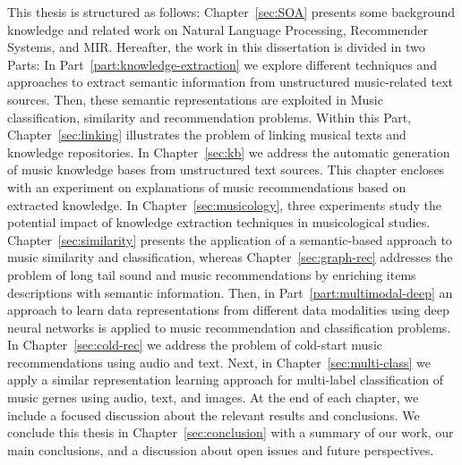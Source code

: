This thesis is structured as follows: Chapter~\ref{sec:SOA} presents some background knowledge and related work on Natural Language Processing, Recommender Systems, and MIR. Hereafter, the work in this dissertation is divided in two Parts: In Part~\ref{part:knowledge-extraction} we explore different techniques and approaches to extract semantic information from unstructured music-related text sources. Then, these semantic representations are exploited in Music classification, similarity and recommendation problems. Within this Part, Chapter~\ref{sec:linking} illustrates the problem of linking musical texts and knowledge repositories. In Chapter~\ref{sec:kb} we address the automatic generation of music knowledge bases from unstructured text sources. This chapter encloses with an experiment on explanations of music recommendations based on extracted knowledge. In Chapter~\ref{sec:musicology}, three experiments study the potential impact of knowledge extraction techniques in musicological studies.
Chapter~\ref{sec:similarity} presents the application of a semantic-based approach to music similarity and classification, whereas Chapter~\ref{sec:graph-rec} addresses the problem of long tail sound and music recommendations by enriching items descriptions with semantic information.
Then, in Part~\ref{part:multimodal-deep} an approach to learn data representations from different data modalities using deep neural networks is applied to music recommendation and classification problems. In Chapter~\ref{sec:cold-rec} we address the problem of cold-start music recommendations using audio and text. Next, in Chapter~\ref{sec:multi-class} we apply a similar representation learning approach for multi-label classification of music gernes using audio, text, and images.
At the end of each chapter, we include a focused discussion about the relevant results and conclusions. We conclude this thesis in Chapter~\ref{sec:conclusion} with a summary of our work, our main conclusions, and a discussion about open issues and future perspectives.





